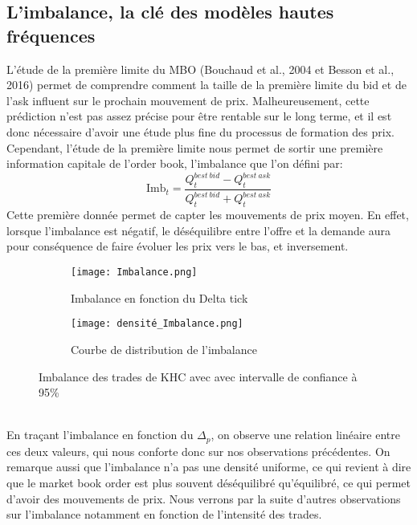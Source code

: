 \documentclass[12pt,a4paper]{article}
\theoremstyle{definition}
\theoremstyle{remark}
\begin{document}
\subsection{L'imbalance, la clé des modèles hautes fréquences}

L'étude de la première limite du MBO (Bouchaud et al., 2004 et Besson et al., 2016) permet de comprendre comment la taille de la première limite du bid et de l'ask influent sur le prochain mouvement de prix. Malheureusement, cette prédiction n'est pas assez précise pour être rentable sur le long terme, et il est donc nécessaire d'avoir une étude plus fine du processus de formation des prix. Cependant, l'étude de la première limite nous permet de sortir une première information capitale de l'order book, l'imbalance que l'on défini par:
$$\text{Imb}_t = \frac{Q^{best\ bid}_t-Q^{best\ ask}_t}{Q^{best\ bid}_t+Q^{best\ ask}_t}$$
Cette première donnée permet de capter les mouvements de prix moyen. En effet, lorsque l'imbalance est négatif, le déséquilibre entre l'offre et la demande aura pour conséquence de faire évoluer les prix vers le bas, et inversement. 
\begin{figure}[h!]
    \centering
    \begin{subfigure}[b]{0.48\textwidth}
        \centering
        \texttt{[image: Imbalance.png]}
        \caption{Imbalance en fonction du Delta tick}
        \label{fig:imbalance}
    \end{subfigure}
    \hfill
    \begin{subfigure}[b]{0.48\textwidth}
        \centering
        \texttt{[image: densité\_Imbalance.png]}
        \caption{Courbe de distribution de l'imbalance}
        \label{fig:densite_imbalance}
    \end{subfigure}
    \caption{Imbalance des trades de KHC avec avec intervalle de confiance à 95\%}
    \label{fig:comparison}
\end{figure}
\\
En traçant l'imbalance en fonction du $\Delta_p$, on observe une relation linéaire entre ces deux valeurs, qui nous conforte donc sur nos observations précédentes. On remarque aussi que l'imbalance n'a pas une densité uniforme, ce qui revient à dire que le market book order est plus souvent déséquilibré qu'équilibré, ce qui permet d'avoir des mouvements de prix. Nous verrons par la suite d'autres observations sur l'imbalance notamment en fonction de l'intensité des trades.
\\
\end{document}
